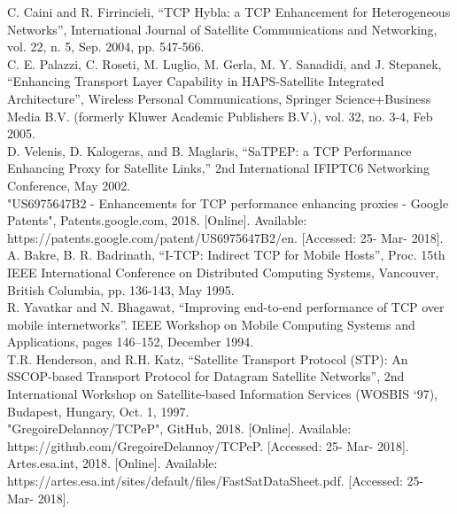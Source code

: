 \documentclass{uathesis}
\begin{document}
\noindent [26] C. Caini and R. Firrincieli, “TCP Hybla: a TCP Enhancement for Heterogeneous Networks”, International Journal of Satellite Communications and Networking, vol. 22, n. 5, Sep. 2004, pp. 547-566.\\

\noindent [27] C. E. Palazzi, C. Roseti, M. Luglio, M. Gerla, M. Y. Sanadidi, and J. Stepanek, “Enhancing Transport Layer Capability in HAPS-Satellite Integrated Architecture”, Wireless Personal Communications, Springer Science+Business Media B.V. (formerly Kluwer Academic Publishers B.V.), vol. 32, no. 3-4, Feb 2005. \\

\noindent [28] D. Velenis, D. Kalogeras, and B. Maglaris, “SaTPEP: a TCP Performance Enhancing Proxy for Satellite Links,” 2nd International IFIPTC6 Networking Conference, May 2002. \\

\noindent [29] "US6975647B2 - Enhancements for TCP performance enhancing proxies - Google Patents", Patents.google.com, 2018. [Online]. Available: https://patents.google.com/patent/US6975647B2/en. [Accessed: 25- Mar- 2018].\\

\noindent [30] A. Bakre, B. R. Badrinath, “I-TCP: Indirect TCP for Mobile Hosts”, Proc. 15th IEEE International Conference on Distributed Computing Systems, Vancouver, British Columbia, pp. 136-143, May 1995. \\

\noindent [31] R. Yavatkar and N. Bhagawat, “Improving end-to-end performance of TCP over mobile internetworks”. IEEE Workshop on Mobile Computing Systems and Applications, pages 146--152, December 1994. \\

\noindent [32] T.R. Henderson, and R.H. Katz, “Satellite Transport Protocol (STP): An SSCOP-based Transport Protocol for Datagram Satellite Networks”, 2nd International Workshop on Satellite-based Information Services (WOSBIS `97), Budapest, Hungary, Oct. 1, 1997. \\

\noindent [33] "GregoireDelannoy/TCPeP", GitHub, 2018. [Online]. Available: https://github.com/GregoireDelannoy/TCPeP. [Accessed: 25- Mar- 2018]. \\

\noindent [34] Artes.esa.int, 2018. [Online]. Available: https://artes.esa.int/sites/default/files/FastSatDataSheet.pdf. [Accessed: 25- Mar- 2018]. \\
\end{document}
